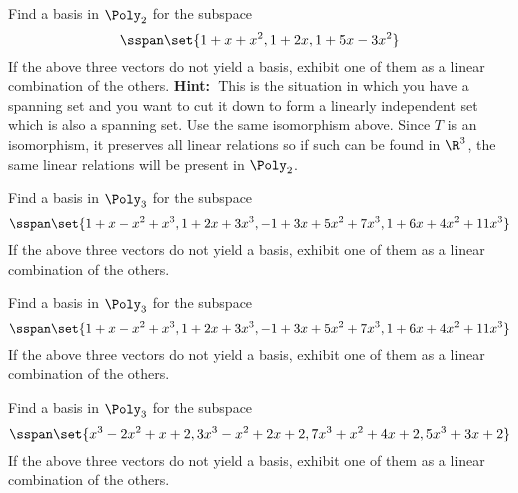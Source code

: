 \begin{ex} Find a basis in $\Poly_{2}$ for the subspace
\begin{equation*}
\sspan\set{1+x+x^{2},1+2x,1+5x-3x^{2}}
\end{equation*}
If the above three vectors do not yield a basis, exhibit one of them as a
linear combination of the others. \textbf{Hint:\ }This is the situation in
which you have a spanning set and you want to cut it down to form a linearly
independent set which is also a spanning set. Use the same isomorphism
above. Since $T$ is an isomorphism, it preserves all linear relations so if
such can be found in $\R^{3}$, the same linear relations will be
present in $\Poly_{2}$.
\end{ex}

\begin{ex} Find a basis in $\Poly_{3}$ for the subspace
\begin{equation*}
\sspan\set{
1+x-x^{2}+x^{3},1+2x+3x^{3},-1+3x+5x^{2}+7x^{3},1+6x+4x^{2}+11x^{3}}
\end{equation*}
If the above three vectors do not yield a basis, exhibit one of them as a
linear combination of the others.
\end{ex}

\begin{ex} Find a basis in $\Poly_{3}$ for the subspace
\begin{equation*}
\sspan\set{
1+x-x^{2}+x^{3},1+2x+3x^{3},-1+3x+5x^{2}+7x^{3},1+6x+4x^{2}+11x^{3}}
\end{equation*}
If the above three vectors do not yield a basis, exhibit one of them as a
linear combination of the others.
\end{ex}

\begin{ex} Find a basis in $\Poly_{3}$ for the subspace
\begin{equation*}
\sspan\set{
x^{3}-2x^{2}+x+2,3x^{3}-x^{2}+2x+2,7x^{3}+x^{2}+4x+2,5x^{3}+3x+2}
\end{equation*}
If the above three vectors do not yield a basis, exhibit one of them as a
linear combination of the others.
\end{ex}

